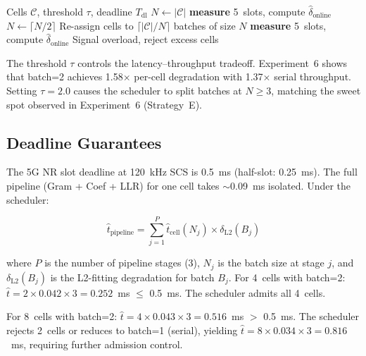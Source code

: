 \begin{algorithm}[h]
\caption{Adaptive batch sizing}
\label{alg:adaptive}
\begin{algorithmic}[1]
\Require Cells $\mathcal{C}$, threshold $\tau$, deadline $T_{\text{dl}}$
\State $N \gets |\mathcal{C}|$ 
\State \textbf{measure} 5~slots, compute $\hat{\delta}_{\text{online}}$
  \State $N \gets \lceil N/2 \rceil$ 
  \State Re-assign cells to $\lceil |\mathcal{C}|/N \rceil$ batches of size $N$
  \State \textbf{measure} 5~slots, compute $\hat{\delta}_{\text{online}}$
\EndWhile
\State {}
  \State Signal overload, reject excess cells
\EndIf
\end{algorithmic}
\end{algorithm}

The threshold $\tau$ controls the latency--throughput tradeoff. Experiment~6 shows that batch=2 achieves 1.58$\times$ per-cell degradation with 1.37$\times$ serial throughput. Setting $\tau = 2.0$ causes the scheduler to split batches at $N \geq 3$, matching the sweet spot observed in Experiment~6 (Strategy~E).

\subsection{Deadline Guarantees}

The 5G NR slot deadline at 120~kHz SCS is 0.5~ms (half-slot: 0.25~ms). The full pipeline (Gram + Coef + LLR) for one cell takes $\sim$0.09~ms isolated. Under the scheduler:

\begin{equation}
\hat{t}_{\text{pipeline}} = \sum_{j=1}^{P} \hat{t}_{\text{cell}}(N_j) \times \delta_{\text{L2}}(B_j)
\end{equation}

where $P$ is the number of pipeline stages (3), $N_j$ is the batch size at stage $j$, and $\delta_{\text{L2}}(B_j)$ is the L2-fitting degradation for batch $B_j$. For 4~cells with batch=2:
$\hat{t} = 2 \times 0.042 \times 3 = 0.252$~ms $\leq$ 0.5~ms. The scheduler admits all 4~cells.

For 8~cells with batch=2: $\hat{t} = 4 \times 0.043 \times 3 = 0.516$~ms $>$ 0.5~ms. The scheduler rejects 2~cells or reduces to batch=1 (serial), yielding $\hat{t} = 8 \times 0.034 \times 3 = 0.816$~ms, requiring further admission control.

